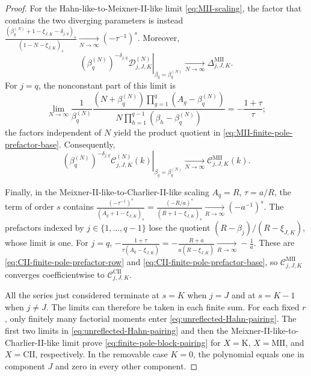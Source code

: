 \documentclass[10pt]{amsart}
\theoremstyle{plain}
\theoremstyle{definition}
\theoremstyle{remark}
\begin{document}
\begin{proof}
For the Hahn-like-to-Meixner-II-like limit \eqref{eq:MII-scaling}, the factor that
contains the two diverging parameters is instead
\(\frac{(\beta_q^{(N)}+1-\xi_{J,K}-\delta_{j,q})_s}
{(1-N-\xi_{J,K})_s}
\xrightarrow[N\to\infty]{}(-\tau^{-1})^s\).
Moreover,
\[
 \left.
 (\beta_q^{(N)})^{-\delta_{j,q}}
 \mathcal D_{j,J,K}^{(N)}
 \right|_{\beta_q=\beta_q^{(N)}}
 \xrightarrow[N\to\infty]{}\Delta_{j,J,K}^{\mathrm{MII}}.
\]
For \(j=q\), the nonconstant part of this limit is
\[
 \lim_{N\to\infty}
 \frac1{\beta_q^{(N)}}
 \frac{(N+\beta_q^{(N)})
       \prod_{g=1}^{q}(A_g-\beta_q^{(N)})}
      {N\prod_{h=1}^{q-1}(\beta_h-\beta_q^{(N)})}
 =-\frac{1+\tau}{\tau};
\]
the factors independent of \(N\) yield the product quotient in
\eqref{eq:MII-finite-pole-prefactor-base}.  Consequently,
\[
 \left.
 (\beta_q^{(N)})^{-\delta_{j,q}}
 \mathcal C_{j,J,K}^{(N)}(k)
 \right|_{\beta_q=\beta_q^{(N)}}
 \xrightarrow[N\to\infty]{}\mathcal C_{j,J,K}^{\mathrm{MII}}(k).
\]

Finally, in the Meixner-II-like-to-Charlier-II-like scaling
\(A_q=R\), \(\tau=a/R\), the term of order \(s\) contains
\(\frac{(-\tau^{-1})^s}{(A_q+1-\xi_{J,K})_s}
=\frac{(-R/a)^s}{(R+1-\xi_{J,K})_s}
\xrightarrow[R\to\infty]{}(-a^{-1})^s\).
The prefactors indexed by \(j\in\{1,\ldots,q-1\}\) lose the quotient
\((R-\beta_j)/(R-\xi_{J,K})\), whose limit is one. For \(j=q\),
\(-\frac{1+\tau}{\tau(A_q-\xi_{J,K})}
=-\frac{R+a}{a(R-\xi_{J,K})}
\xrightarrow[R\to\infty]{}-\frac1a\).
These are \eqref{eq:CII-finite-pole-prefactor-row} and
\eqref{eq:CII-finite-pole-prefactor-base}, so
\(\mathcal C_{j,J,K}^{\mathrm{MII}}\) converges coefficientwise to
\(\mathcal C_{j,J,K}^{\mathrm{CII}}\).

All the series just considered terminate at \(s=K\) when \(j=J\) and
at \(s=K-1\) when \(j\ne J\).  The limits can therefore be taken in
each finite sum.  For each fixed \(r\), only finitely many factorial
moments enter \eqref{eq:unreflected-Hahn-pairing}. The first two limits
in \eqref{eq:unreflected-Hahn-pairing} and then the
Meixner-II-like-to-Charlier-II-like limit prove
\eqref{eq:finite-pole-block-pairing} for \(X=\mathrm K\),
\(X=\mathrm{MII}\), and \(X=\mathrm{CII}\), respectively. In the
removable case \(K=0\), the polynomial equals one in component \(J\) and
zero in every other component.


\end{proof}
\end{document}
